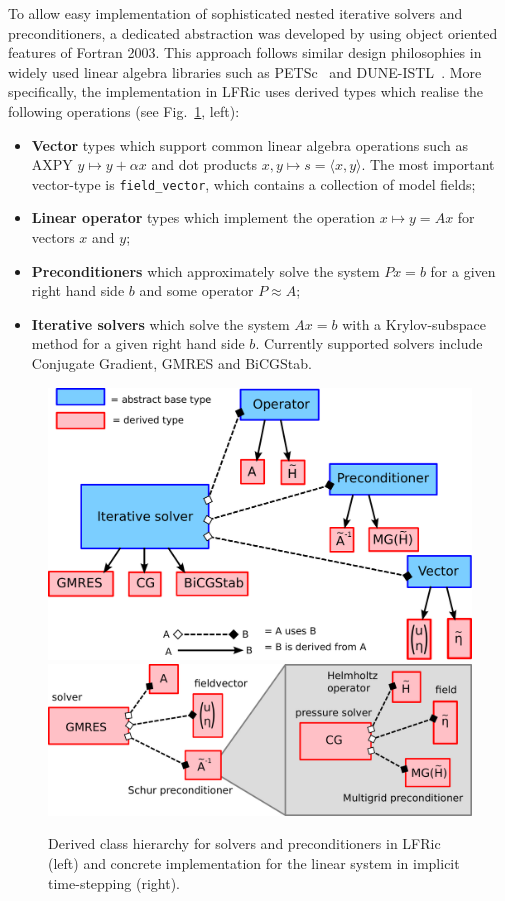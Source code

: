 \documentclass[review,times]{elsarticle}
\begin{document}
To allow easy implementation of sophisticated nested iterative solvers
and preconditioners, a dedicated abstraction was developed by using
object oriented features of Fortran 2003. This approach
follows similar design philosophies in widely used linear algebra
libraries such as PETSc~\cite{Balay1997,Balay2018} and DUNE-ISTL~\cite{Blatt2007}. 
More specifically, the implementation in LFRic uses
derived types which realise the following operations (see
Fig.~\ref{fig:class_hierarchy}, left):
\begin{itemize}
\item \textbf{Vector} types which support common linear algebra
  operations such as AXPY $y\mapsto y+\alpha x$ and dot products
  $x,y\mapsto s = \langle x,y\rangle$. The most important vector-type
  is \texttt{field\_vector}, which contains a collection of model
  fields;
\item \textbf{Linear operator} types which implement the operation $x\mapsto y=Ax$ for vectors $x$ and $y$;
\item \textbf{Preconditioners} which approximately solve the system $Px=b$ for a
  given right hand side $b$ and some operator $P\approx A$;
\item \textbf{Iterative solvers} which solve the system $Ax=b$ with a
  Krylov-subspace method for a given right hand side $b$. Currently
  supported solvers include Conjugate Gradient, GMRES and BiCGStab.
\end{itemize}
\begin{figure}
  \begin{center}
    \includegraphics[width=0.45\linewidth]{Fig6a_class_hierarchy.pdf}
    \hfill
    \includegraphics[width=0.45\linewidth]{Fig6b_class_concrete.pdf}
    \caption{Derived class hierarchy for solvers and preconditioners
      in LFRic (left) and concrete implementation for the linear
      system in implicit time-stepping (right).}
    \label{fig:class_hierarchy}
  \end{center}
\end{figure}
\end{document}
